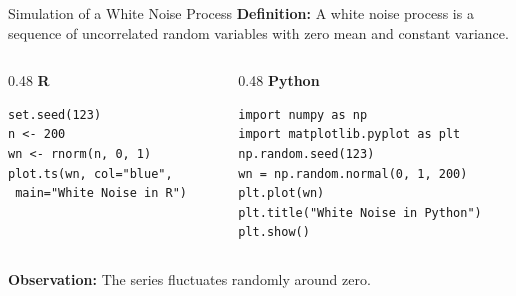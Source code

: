 \documentclass[aspectratio=169]{beamer}
\begin{document}
\begin{frame}[fragile]{Simulation of a White Noise Process}
\small
\textbf{Definition:} A white noise process is a sequence of uncorrelated random variables with zero mean and constant variance.

\vspace{0.2cm}

\begin{columns}[T]
\begin{column}{0.48\textwidth}
\textbf{R}
\begin{verbatim}
set.seed(123)
n <- 200
wn <- rnorm(n, 0, 1)
plot.ts(wn, col="blue",
 main="White Noise in R")
\end{verbatim}
\end{column}

\begin{column}{0.48\textwidth}
\textbf{Python}
\begin{verbatim}
import numpy as np
import matplotlib.pyplot as plt
np.random.seed(123)
wn = np.random.normal(0, 1, 200)
plt.plot(wn)
plt.title("White Noise in Python")
plt.show()
\end{verbatim}
\end{column}
\end{columns}

\vspace{0.1cm}
\textbf{Observation:} The series fluctuates randomly around zero.
\end{frame}
\end{document}
